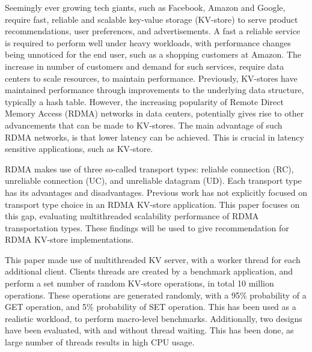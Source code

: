 


\begin{abstracts}        %

    Seemingly ever growing tech giants, such as Facebook, Amazon and Google, require fast, reliable and scalable key-value storage (KV-store) to serve product recommendations, user preferences, and advertisements.
    A fast a reliable service is required to perform well under heavy workloads, with performance changes being unnoticed for the end user, such as a shopping customers at Amazon.
    The increase in number of customers and demand for such services, require data centers to scale resources, to maintain performance.
    Previously, KV-stores have maintained performance through improvements to the underlying data structure, typically a hash table.
    However, the increasing popularity of Remote Direct Memory Access (RDMA) networks in data centers, potentially gives rise to other advancements that can be made to KV-stores.
    The main advantage of such RDMA networks, is that lower latency can be achieved.
    This is crucial in latency sensitive applications, such as KV-store.

    RDMA makes use of three so-called transport types: reliable connection (RC), unreliable connection (UC), and unreliable datagram (UD).
    Each transport type has its advantages and disadvantages.
    Previous work has not explicitly focused on transport type choice in an RDMA KV-store application.
    This paper focuses on this gap, evaluating multithreaded scalability performance of RDMA transportation types.
    These findings will be used to give recommendation for RDMA KV-store implementations.

    This paper made use of multithreaded KV server, with a worker thread for each additional client.
    Clients threads are created by a benchmark application, and perform a set number of random KV-store operations, in total 10 million operations.
    These operations are generated randomly, with a 95\% probability of a GET operation, and 5\% probability of SET operation.
    This has been used as a realistic workload, to perform macro-level benchmarks.
    Additionally, two designs have been evaluated, with and without thread waiting.
    This has been done, as large number of threads results in high CPU usage.


\end{abstracts}
